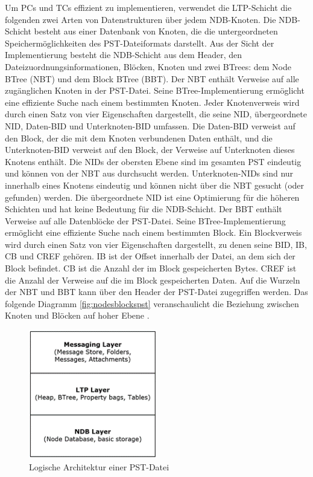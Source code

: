 Um PCs und TCs effizient zu implementieren, verwendet die LTP-Schicht die folgenden zwei Arten von Datenstrukturen über jedem NDB-Knoten.
Die NDB-Schicht besteht aus einer Datenbank von Knoten, die die untergeordneten Speichermöglichkeiten des PST-Dateiformats darstellt. Aus der Sicht der Implementierung besteht die NDB-Schicht aus dem Header, den Dateizuordnungsinformationen, Blöcken, Knoten und zwei BTrees: dem Node BTree (NBT) und dem Block BTree (BBT). Der NBT enthält Verweise auf alle zugänglichen Knoten in der PST-Datei. Seine BTree-Implementierung ermöglicht eine effiziente Suche nach einem bestimmten Knoten. Jeder Knotenverweis wird durch einen Satz von vier Eigenschaften dargestellt, die seine NID, übergeordnete NID, Daten-BID und Unterknoten-BID umfassen. Die Daten-BID verweist auf den Block, der die mit dem Knoten verbundenen Daten enthält, und die Unterknoten-BID verweist auf den Block, der Verweise auf Unterknoten dieses Knotens enthält. Die NIDs der obersten Ebene sind im gesamten PST eindeutig und können von der NBT aus durchsucht werden. Unterknoten-NIDs sind nur innerhalb eines Knotens eindeutig und können nicht über die NBT gesucht (oder gefunden) werden. Die übergeordnete NID ist eine Optimierung für die höheren Schichten und hat keine Bedeutung für die NDB-Schicht. Der BBT enthält Verweise auf alle Datenblöcke der PST-Datei. Seine BTree-Implementierung ermöglicht eine effiziente Suche nach einem bestimmten Block. Ein Blockverweis wird durch einen Satz von vier Eigenschaften dargestellt, zu denen seine BID, IB, CB und CREF gehören. IB ist der Offset innerhalb der Datei, an dem sich der Block befindet. CB ist die Anzahl der im Block gespeicherten Bytes. CREF ist die Anzahl der Verweise auf die im Block gespeicherten Daten. Auf die Wurzeln der NBT und BBT kann über den Header der PST-Datei zugegriffen werden.
Das folgende Diagramm \ref{fig:nodesblockspst} veranschaulicht die Beziehung zwischen Knoten und Blöcken auf hoher Ebene \cite{.c}.

\begin{figure}
    \centering
    \includegraphics[width=0.50\textwidth]{images/PST_File.png}
    \caption{Logische Architektur einer PST-Datei \cite{.c}} 
    \label{fig:pstarchitecture}
\end{figure}

